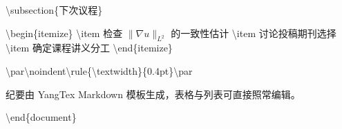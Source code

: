 \documentclass[UTF8,a4paper,11pt,fontset=fandol]{ctexart}
\begin{document}
\textbackslash{}subsection\{下次议程\}

\textbackslash{}begin\{itemize\} \textbackslash{}item 检查 $\|\nabla u\|_{L^2}$ 的一致性估计 \textbackslash{}item 讨论投稿期刊选择 \textbackslash{}item 确定课程讲义分工 \textbackslash{}end\{itemize\}

\textbackslash{}par\textbackslash{}noindent\textbackslash{}rule\{\textbackslash{}textwidth\}\{0.4pt\}\textbackslash{}par

纪要由 YangTex Markdown 模板生成，表格与列表可直接照常编辑。

\textbackslash{}end\{document\}
\end{document}
